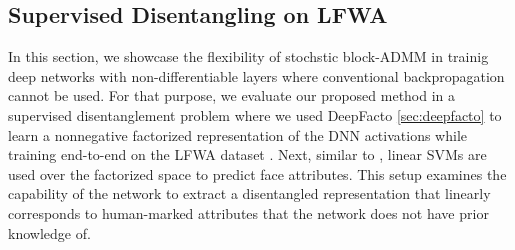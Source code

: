 


% 

\subsection{Supervised Disentangling on LFWA}\label{exp:hetero}


In this section, we showcase the flexibility of stochstic block-ADMM in trainig deep networks with non-differentiable layers where conventional backpropagation cannot be used. For that purpose, we evaluate our proposed method in a supervised disentanglement problem where we used DeepFacto \ref{sec:deepfacto} to learn a nonnegative factorized representation of the DNN activations while training end-to-end on the LFWA dataset \cite{LFWTech}. Next, similar to \cite{liu2018exploring}, linear SVMs are used over the factorized space to predict face attributes. This setup examines the capability of the network to extract a disentangled representation that linearly corresponds to human-marked attributes that the network does not have prior knowledge of.

